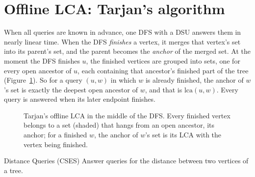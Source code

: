\section[Offline LCA]{Offline LCA: Tarjan's algorithm \hfill \plat}\label{sec:offlinelca}

When all queries are known in advance, one DFS with a DSU answers them in nearly linear time. When the DFS \emph{finishes} a vertex,
it merges that vertex's set into its parent's set, and the parent becomes the \emph{anchor} of the merged set. At the moment the DFS
finishes $u$, the finished vertices are grouped into sets, one for every open ancestor of $u$, each containing that ancestor's
finished part of the tree (Figure~\ref{fig:tarjanlca}). So for a query $(u, w)$ in which $w$ is already finished, the anchor of $w$'s
set is exactly the deepest open ancestor of $w$, and that is $\mathrm{lca}(u, w)$. Every query is answered when its later endpoint
finishes.

\begin{figure}[htbp]
\centering
{}
\caption{Tarjan's offline LCA in the middle of the DFS. Every finished vertex belongs to a set (shaded) that hangs from an open
ancestor, its anchor; for a finished $w$, the anchor of $w$'s set is its LCA with the vertex being finished.}
\label{fig:tarjanlca}
\end{figure}

\begin{problem}{Distance Queries (CSES)}
Answer queries for the distance between two vertices of a tree.
\end{problem}

